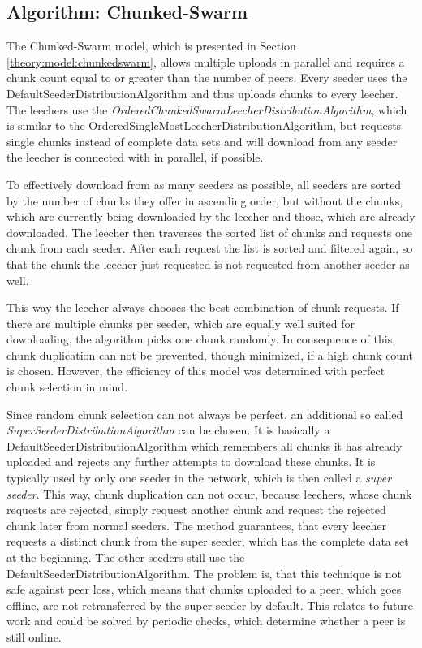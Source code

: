 \subsection{Algorithm: Chunked-Swarm}
\label{module:algorithm:chunkedswarm}
The Chunked-Swarm model, which is presented in Section \ref{theory:model:chunkedswarm}, allows multiple uploads in parallel and requires a chunk count equal to or greater than the number of peers. Every seeder uses the DefaultSeederDistributionAlgorithm and thus uploads chunks to every leecher. The leechers use the \emph{OrderedChunkedSwarmLeecherDistributionAlgorithm}, which is similar to the OrderedSingleMostLeecherDistributionAlgorithm, but requests single chunks instead of complete data sets and will download from any seeder the leecher is connected with in parallel, if possible. 

\pagebreak

To effectively download from as many seeders as possible, all seeders are sorted by the number of chunks they offer in ascending order, but without the chunks, which are currently being downloaded by the leecher and those, which are already downloaded. The leecher then traverses the sorted list of chunks and requests one chunk from each seeder. After each request the list is sorted and filtered again, so that the chunk the leecher just requested is not requested from another seeder as well. 

This way the leecher always chooses the best combination of chunk requests. If there are multiple chunks per seeder, which are equally well suited for downloading, the algorithm picks one chunk randomly. In consequence of this, chunk duplication can not be prevented, though minimized, if a high chunk count is chosen. However, the efficiency of this model was determined with perfect chunk selection in mind. 

Since random chunk selection can not always be perfect, an additional so called \emph{SuperSeederDistributionAlgorithm} can be chosen. It is basically a DefaultSeederDistributionAlgorithm which remembers all chunks it has already uploaded and rejects any further attempts to download these chunks. It is typically used by only one seeder in the network, which is then called a \emph{super seeder}. This way, chunk duplication can not occur, because leechers, whose chunk requests are rejected, simply request another chunk and request the rejected chunk later from normal seeders. The method guarantees, that every leecher requests a distinct chunk from the super seeder, which has the complete data set at the beginning. The other seeders still use the DefaultSeederDistributionAlgorithm. The problem is, that this technique is not safe against peer loss, which means that chunks uploaded to a peer, which goes offline, are not retransferred by the super seeder by default. This relates to future work and could be solved by periodic checks, which determine whether a peer is still online.


